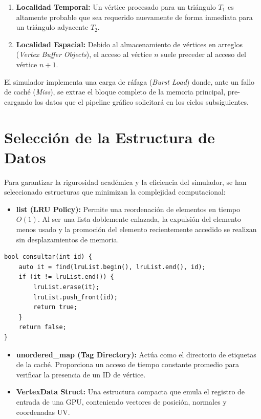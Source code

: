 \documentclass[12pt,a4paper]{article}
\begin{document}
\begin{enumerate}
    \item \textbf{Localidad Temporal:} Un vértice procesado para un triángulo $T_1$ es altamente probable que sea requerido nuevamente de forma inmediata para un triángulo adyacente $T_2$.
    \item \textbf{Localidad Espacial:} Debido al almacenamiento de vértices en arreglos (\textit{Vertex Buffer Objects}), el acceso al vértice $n$ suele preceder al acceso del vértice $n+1$. 
\end{enumerate}

El simulador implementa una carga de ráfaga (\textit{Burst Load}) donde, ante un fallo de caché (\textit{Miss}), se extrae el bloque completo de la memoria principal, pre-cargando los datos que el pipeline gráfico solicitará en los ciclos subsiguientes.

\section{Selección de la Estructura de Datos}
Para garantizar la rigurosidad académica y la eficiencia del simulador, se han seleccionado estructuras que minimizan la complejidad computacional:

\begin{itemize}
    \item \textbf{list (LRU Policy):} Permite una reordenación de elementos en tiempo $O(1)$. Al ser una lista doblemente enlazada, la expulsión del elemento menos usado y la promoción del elemento recientemente accedido se realizan sin desplazamientos de memoria.
\end{itemize}

\begin{lstlisting}
bool consultar(int id) {
    auto it = find(lruList.begin(), lruList.end(), id);
    if (it != lruList.end()) {
        lruList.erase(it);
        lruList.push_front(id);
        return true;
    }
    return false;
}
\end{lstlisting}

\begin{itemize}
    \item \textbf{unordered\_map (Tag Directory):} Actúa como el directorio de etiquetas de la caché. Proporciona un acceso de tiempo constante promedio para verificar la presencia de un ID de vértice.
    \item \textbf{VertexData Struct:} Una estructura compacta que emula el registro de entrada de una GPU, conteniendo vectores de posición, normales y coordenadas UV.
\end{itemize}
\end{document}
